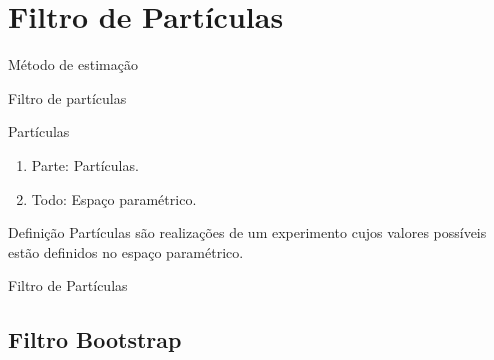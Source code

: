 \documentclass{beamer}
\begin{document}
\section{Filtro de Partículas}

\begin{frame}{Método de estimação}
    \begin{block}{}
      \Huge  Filtro de partículas
    \end{block}

\end{frame}



\begin{frame}{Partículas}
\noindent


    \begin{enumerate}
      \item<2-| alert@2> Parte: Partículas.
      \item<3-| alert@3> Todo: Espaço paramétrico.
    \end{enumerate}
    
\pause
\pause
\pause
  \begin{block}{Definição}
  {\large Partículas são realizações de um experimento cujos valores possíveis estão definidos no espaço paramétrico.}
\end{block}


 
\end{frame}



\begin{frame}{}
    \begin{block}{}
      \Huge  Filtro de Partículas
    \end{block}
\end{frame}

\subsection{Filtro Bootstrap}
\end{document}
